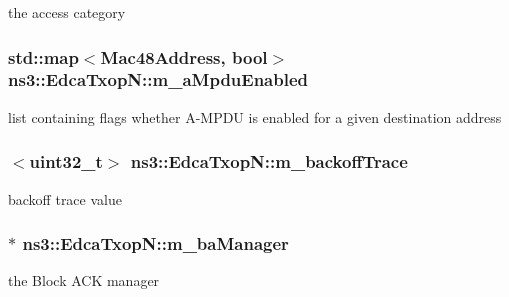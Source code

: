 the access category 

\subsubsection[{\texorpdfstring{m\+\_\+a\+Mpdu\+Enabled}{m_aMpduEnabled}}]{\setlength{\rightskip}{0pt plus 5cm}std\+::map$<${\bf Mac48\+Address}, bool$>$ ns3\+::\+Edca\+Txop\+N\+::m\+\_\+a\+Mpdu\+Enabled}\hypertarget{classns3_1_1EdcaTxopN_aacbbbb0f23485401937e97a93bbbfe37}{}\label{classns3_1_1EdcaTxopN_aacbbbb0f23485401937e97a93bbbfe37}


list containing flags whether A-\/\+M\+P\+DU is enabled for a given destination address 

\subsubsection[{\texorpdfstring{m\+\_\+backoff\+Trace}{m_backoffTrace}}]{$<$uint32\+\_\+t$>$ ns3\+::\+Edca\+Txop\+N\+::m\+\_\+backoff\+Trace\hspace{0.3cm}{\ttfamily [private]}}\hypertarget{classns3_1_1EdcaTxopN_a3a10f51712278eab1cb3ab744fc7da6f}{}\label{classns3_1_1EdcaTxopN_a3a10f51712278eab1cb3ab744fc7da6f}


backoff trace value 

\subsubsection[{\texorpdfstring{m\+\_\+ba\+Manager}{m_baManager}}]{$\ast$ ns3\+::\+Edca\+Txop\+N\+::m\+\_\+ba\+Manager\hspace{0.3cm}{\ttfamily [private]}}\hypertarget{classns3_1_1EdcaTxopN_a7a79eaafe03995bb274451aa752b83b2}{}\label{classns3_1_1EdcaTxopN_a7a79eaafe03995bb274451aa752b83b2}


the Block A\+CK manager 

